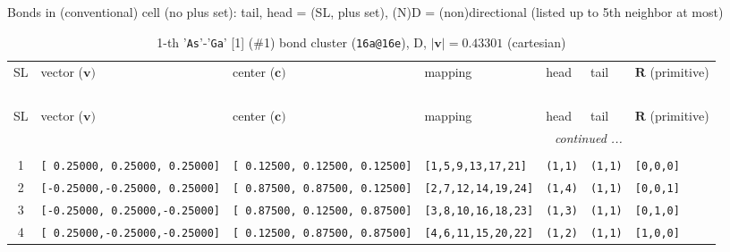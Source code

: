\documentclass[fleqn,10pt,landscape]{jsarticle}
\begin{document}
\noindent Bonds in (conventional) cell (no plus set): tail, head = (SL, plus set), (N)D = (non)directional (listed up to 5th neighbor at most)

\renewcommand{\arraystretch}{1.6}
\begin{longtable}[l]{cllllll}
\captionsetup{justification=raggedright, singlelinecheck=off}
\caption{1-th '\texttt{As}'-'\texttt{Ga}' [1] (\#1) bond cluster (\texttt{16a@16e}), D, $|\bm{v}|=0.43301$ (cartesian)}
 \\
 \hline \hline
SL & vector ($\bm{v})$ & center ($\bm{c})$ & mapping & head & tail & $\bm{R}$ (primitive) \\ \hline \endfirsthead

\multicolumn{6}{l}{\tablename\ \thetable{}} \\
 \hline \hline
SL & vector ($\bm{v})$ & center ($\bm{c})$ & mapping & head & tail & $\bm{R}$ (primitive) \\ \hline \endhead

 \hline \hline
\multicolumn{6}{r}{\footnotesize\it continued ...} \\ \endfoot

 \hline \hline
\multicolumn{6}{r}{} \\ \endlastfoot

1 & \texttt{[ 0.25000, 0.25000, 0.25000]} & \texttt{[ 0.12500, 0.12500, 0.12500]} & \texttt{[1,5,9,13,17,21]} & \texttt{(1,1)} & \texttt{(1,1)} & \texttt{[0,0,0]} \\ \hline
2 & \texttt{[-0.25000,-0.25000, 0.25000]} & \texttt{[ 0.87500, 0.87500, 0.12500]} & \texttt{[2,7,12,14,19,24]} & \texttt{(1,4)} & \texttt{(1,1)} & \texttt{[0,0,1]} \\ \hline
3 & \texttt{[-0.25000, 0.25000,-0.25000]} & \texttt{[ 0.87500, 0.12500, 0.87500]} & \texttt{[3,8,10,16,18,23]} & \texttt{(1,3)} & \texttt{(1,1)} & \texttt{[0,1,0]} \\ \hline
4 & \texttt{[ 0.25000,-0.25000,-0.25000]} & \texttt{[ 0.12500, 0.87500, 0.87500]} & \texttt{[4,6,11,15,20,22]} & \texttt{(1,2)} & \texttt{(1,1)} & \texttt{[1,0,0]} \\
\end{longtable}
\end{document}

